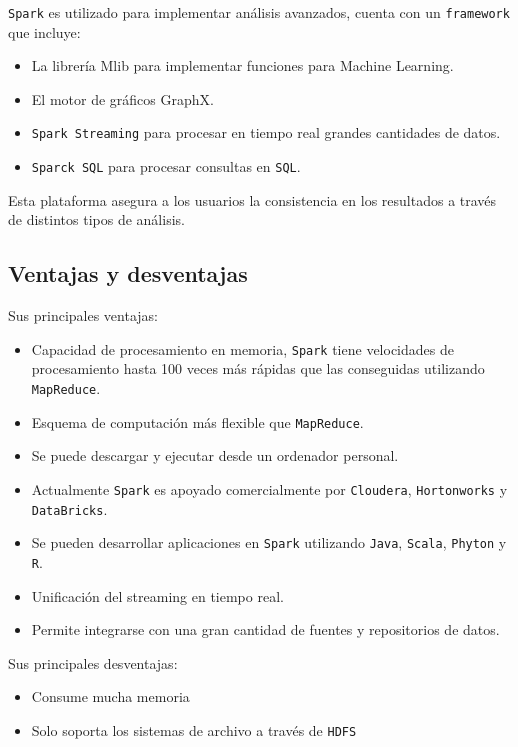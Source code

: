 \documentclass[]{article}
\begin{document}
\texttt{Spark} es utilizado para implementar análisis avanzados, cuenta
con un \texttt{framework} que incluye:

\begin{itemize}
\itemsep1pt\parskip0pt
\item
  La librería Mlib para implementar funciones para Machine Learning.
\item
  El motor de gráficos GraphX.
\item
  \texttt{Spark Streaming} para procesar en tiempo real grandes
  cantidades de datos.
\item
  \texttt{Sparck SQL} para procesar consultas en \texttt{SQL}.
\end{itemize}

Esta plataforma asegura a los usuarios la consistencia en los resultados
a través de distintos tipos de análisis.

\subsection{Ventajas y desventajas}\label{ventajas-y-desventajas-1}

Sus principales ventajas:

\begin{itemize}
\itemsep1pt\parskip0pt
\item
  Capacidad de procesamiento en memoria, \texttt{Spark} tiene
  velocidades de procesamiento hasta 100 veces más rápidas que las
  conseguidas utilizando \texttt{MapReduce}.
\item
  Esquema de computación más flexible que \texttt{MapReduce}.
\item
  Se puede descargar y ejecutar desde un ordenador personal.
\item
  Actualmente \texttt{Spark} es apoyado comercialmente por
  \texttt{Cloudera}, \texttt{Hortonworks} y \texttt{DataBricks}.
\item
  Se pueden desarrollar aplicaciones en \texttt{Spark} utilizando
  \texttt{Java}, \texttt{Scala}, \texttt{Phyton} y \texttt{R}.
\item
  Unificación del streaming en tiempo real.
\item
  Permite integrarse con una gran cantidad de fuentes y repositorios de
  datos.
\end{itemize}

Sus principales desventajas:

\begin{itemize}
\itemsep1pt\parskip0pt
\item
  Consume mucha memoria
\item
  Solo soporta los sistemas de archivo a través de \texttt{HDFS}
\end{itemize}
\end{document}
